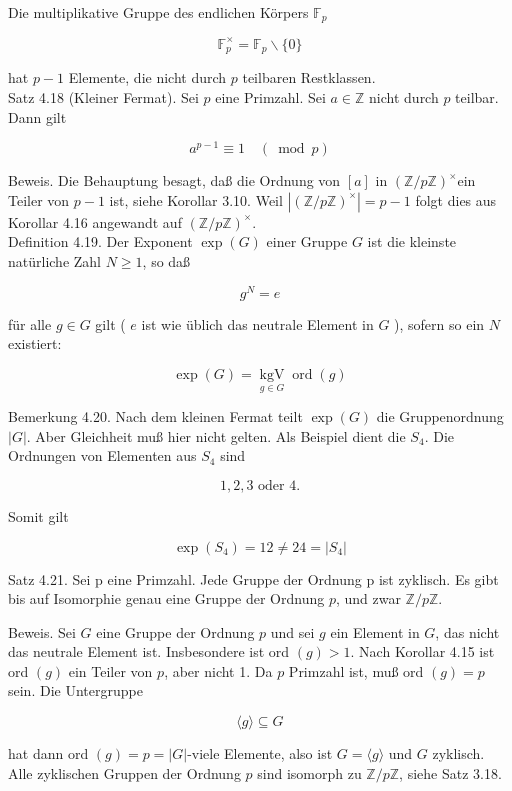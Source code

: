 \documentclass[10pt, letterpaper]{article}
\begin{document}
Die multiplikative Gruppe des endlichen Körpers $\mathbb{F}_{p}$

$$
\mathbb{F}_{p}^{\times}=\mathbb{F}_{p} \backslash\{0\}
$$

hat $p-1$ Elemente, die nicht durch $p$ teilbaren Restklassen.\\
Satz 4.18 (Kleiner Fermat). Sei $p$ eine Primzahl. Sei $a \in \mathbb{Z}$ nicht durch $p$ teilbar. Dann gilt

$$
a^{p-1} \equiv 1 \quad(\bmod p)
$$

Beweis. Die Behauptung besagt, daß die Ordnung von $[a]$ in $(\mathbb{Z} / p \mathbb{Z})^{\times}$ein Teiler von $p-1$ ist, siehe Korollar 3.10. Weil $\left|(\mathbb{Z} / p \mathbb{Z})^{\times}\right|=p-1$ folgt dies aus Korollar 4.16 angewandt auf $(\mathbb{Z} / p \mathbb{Z})^{\times}$.\\
Definition 4.19. Der Exponent $\exp (G)$ einer Gruppe $G$ ist die kleinste natürliche Zahl $N \geq 1$, so daß

$$
g^{N}=e
$$

für alle $g \in G$ gilt ( $e$ ist wie üblich das neutrale Element in $G$ ), sofern so ein $N$ existiert:

$$
\exp (G)=\underset{g \in G}{\operatorname{kgV}} \operatorname{ord}(g)
$$

Bemerkung 4.20. Nach dem kleinen Fermat teilt $\exp (G)$ die Gruppenordnung $|G|$. Aber Gleichheit muß hier nicht gelten. Als Beispiel dient die $S_{4}$. Die Ordnungen von Elementen aus $S_{4}$ sind

$$
1,2,3 \text { oder } 4 .
$$

Somit gilt

$$
\exp \left(S_{4}\right)=12 \neq 24=\left|S_{4}\right|
$$

Satz 4.21. Sei p eine Primzahl. Jede Gruppe der Ordnung p ist zyklisch. Es gibt bis auf Isomorphie genau eine Gruppe der Ordnung $p$, und zwar $\mathbb{Z} / p \mathbb{Z}$.

Beweis. Sei $G$ eine Gruppe der Ordnung $p$ und sei $g$ ein Element in $G$, das nicht das neutrale Element ist. Insbesondere ist ord $(g)>1$. Nach Korollar 4.15 ist ord $(g)$ ein Teiler von $p$, aber nicht 1. Da $p$ Primzahl ist, muß ord $(g)=p$ sein. Die Untergruppe

$$
\langle g\rangle \subseteq G
$$

hat dann ord $(g)=p=|G|$-viele Elemente, also ist $G=\langle g\rangle$ und $G$ zyklisch.\\
Alle zyklischen Gruppen der Ordnung $p$ sind isomorph zu $\mathbb{Z} / p \mathbb{Z}$, siehe Satz 3.18.
\end{document}
